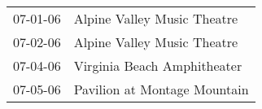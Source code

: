 \begin{supertabular}{p{0.07\textwidth}p{0.23\textwidth}}
 07-01-06 &   Alpine Valley Music Theatre \\
 07-02-06 &   Alpine Valley Music Theatre \\
 07-04-06 &   Virginia Beach Amphitheater \\
 07-05-06 &  Pavilion at Montage Mountain \\
\end{supertabular}

